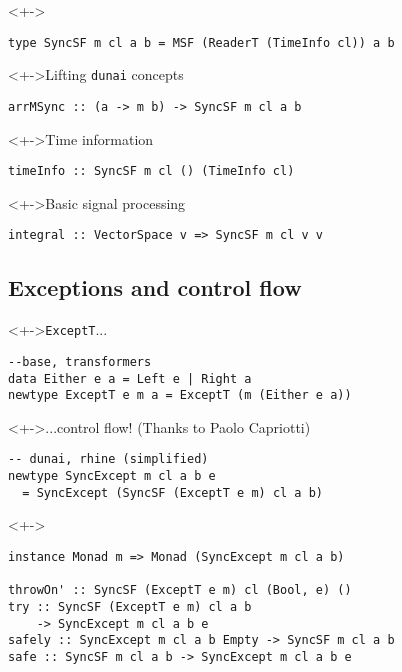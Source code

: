 \documentclass[handout]{enigtex-beamer-base}
\begin{document}
\begin{frame}[fragile]
\begin{block}<+->{}
\begin{verbatim}
type SyncSF m cl a b = MSF (ReaderT (TimeInfo cl)) a b
\end{verbatim}
\end{block}
\begin{block}<+->{Lifting \texttt{dunai} concepts}
\begin{verbatim}
arrMSync :: (a -> m b) -> SyncSF m cl a b
\end{verbatim}
\end{block}
\begin{block}<+->{Time information}
\begin{verbatim}
timeInfo :: SyncSF m cl () (TimeInfo cl)
\end{verbatim}
\end{block}
\begin{block}<+->{Basic signal processing}
\begin{verbatim}
integral :: VectorSpace v => SyncSF m cl v v
\end{verbatim}
\end{block}
\end{frame}

\subsection{Exceptions and control flow}

\begin{frame}[fragile]
\begin{block}<+->{\texttt{ExceptT}...}
\begin{verbatim}
--base, transformers
data Either e a = Left e | Right a
newtype ExceptT e m a = ExceptT (m (Either e a))
\end{verbatim}
\end{block}

\begin{block}<+->{...control flow! (Thanks to Paolo Capriotti)}
\begin{verbatim}
-- dunai, rhine (simplified)
newtype SyncExcept m cl a b e
  = SyncExcept (SyncSF (ExceptT e m) cl a b)
\end{verbatim}
\end{block}

\begin{block}<+->{}
\begin{verbatim}
instance Monad m => Monad (SyncExcept m cl a b)

throwOn' :: SyncSF (ExceptT e m) cl (Bool, e) ()
try :: SyncSF (ExceptT e m) cl a b
    -> SyncExcept m cl a b e
safely :: SyncExcept m cl a b Empty -> SyncSF m cl a b
safe :: SyncSF m cl a b -> SyncExcept m cl a b e
\end{verbatim}
\end{block}
\end{frame}
\end{document}

